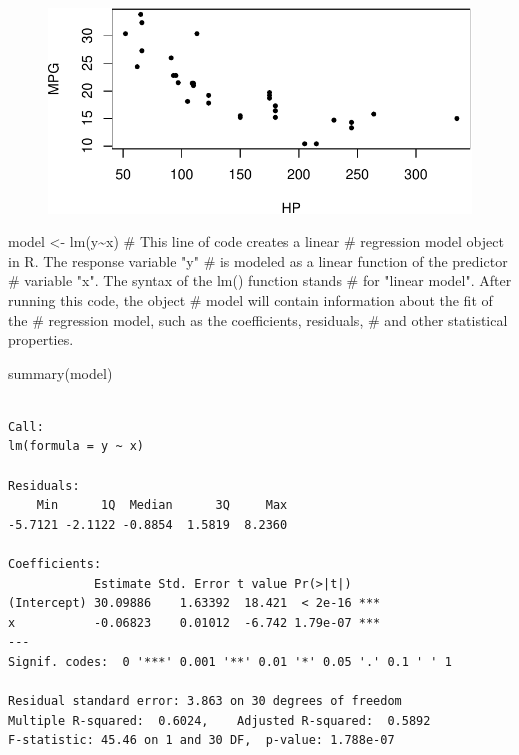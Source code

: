 \documentclass[
  letterpaper,
  DIV=11,
  numbers=noendperiod]{scrartcl}
\newenvironment{Shaded}{\begin{snugshade}}{\end{snugshade}}
\newcommand{\CommentTok}[1]{\textcolor[rgb]{0.37,0.37,0.37}{#1}}
\newcommand{\FunctionTok}[1]{\textcolor[rgb]{0.28,0.35,0.67}{#1}}
\newcommand{\NormalTok}[1]{\textcolor[rgb]{0.00,0.23,0.31}{#1}}
\newcommand{\OtherTok}[1]{\textcolor[rgb]{0.00,0.23,0.31}{#1}}
\newcommand{\SpecialCharTok}[1]{\textcolor[rgb]{0.37,0.37,0.37}{#1}}
\begin{document}
\begin{figure}[H]

{\centering \includegraphics{index_files/figure-pdf/unnamed-chunk-3-1.pdf}

}

\end{figure}

\begin{Shaded}
\begin{Highlighting}[]
\NormalTok{model }\OtherTok{\textless{}{-}} \FunctionTok{lm}\NormalTok{(y}\SpecialCharTok{\textasciitilde{}}\NormalTok{x) }\CommentTok{\# This line of code creates a linear}
\CommentTok{\# regression model object in R. The response variable "y"}
\CommentTok{\# is modeled as a linear function of the predictor}
\CommentTok{\# variable "x". The syntax of the lm() function stands}
\CommentTok{\# for "linear model". After running this code, the object}
\CommentTok{\# model will contain information about the fit of the}
\CommentTok{\# regression model, such as the coefficients, residuals,}
\CommentTok{\# and other statistical properties.}

\FunctionTok{summary}\NormalTok{(model)}
\end{Highlighting}
\end{Shaded}

\begin{verbatim}

Call:
lm(formula = y ~ x)

Residuals:
    Min      1Q  Median      3Q     Max 
-5.7121 -2.1122 -0.8854  1.5819  8.2360 

Coefficients:
            Estimate Std. Error t value Pr(>|t|)    
(Intercept) 30.09886    1.63392  18.421  < 2e-16 ***
x           -0.06823    0.01012  -6.742 1.79e-07 ***
---
Signif. codes:  0 '***' 0.001 '**' 0.01 '*' 0.05 '.' 0.1 ' ' 1

Residual standard error: 3.863 on 30 degrees of freedom
Multiple R-squared:  0.6024,    Adjusted R-squared:  0.5892 
F-statistic: 45.46 on 1 and 30 DF,  p-value: 1.788e-07
\end{verbatim}
\end{document}
